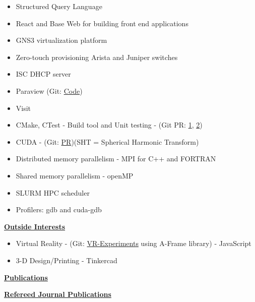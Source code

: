\documentclass[11pt]{ltxdoc}
\begin{document}
\begin{description}
      \begin{itemize}
        \item Structured Query Language
        \item React and Base Web for building front end applications
        \item GNS3 virtualization platform
        \item Zero-touch provisioning Arista and Juniper switches
        \item ISC DHCP server
        \item Paraview (Git: \href{https://github.com/hlokavarapu/computational_tools/blob/master/Paraview_scripts/Find_timestep_given_nondim_time_2_comp.py}{Code})
        \item Visit
        \item CMake, CTest - Build tool and Unit testing - (Git PR: \href{https://github.com/hlokavarapu/computational_tools/tree/master/ASPECT_build_scripts}{1}, \href{https://github.com/geodynamics/calypso/pull/4}{2})
        \item CUDA - (Git: \href{https://github.com/geodynamics/calypso/pull/3}{PR})(SHT = Spherical Harmonic Transform) 
        \item Distributed memory parallelism - MPI for C++ and FORTRAN   
        \item Shared memory parallelism - openMP
        \item SLURM HPC scheduler          
        \item Profilers: gdb and cuda-gdb
      \end{itemize}
      
  \item[] \textbf{\underline{Outside Interests}}
    
      \begin{itemize}
        \item Virtual Reality - (Git: \href{https://github.com/hlokavarapu/VR-Experiments}{VR-Experiments} using A-Frame library) - JavaScript
        \item  3-D Design/Printing - Tinkercad
      \end{itemize}
  \end{description}
  


\vskip 12pt

\begin{center}
  \textbf{\underline{Publications}}
\end{center}

\noindent
\textbf{\underline{Refereed Journal Publications}}
\end{document}
